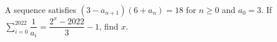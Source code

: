 A sequence satisfies $(3-a_{n+1})(6+a_n)=18$ for $n\ge0$ and $a_0=3$. If $\displaystyle\sum_{i=0}^{2022}\dfrac1{a_i}=\dfrac{2^x-2022}3-1$, find $x$.
